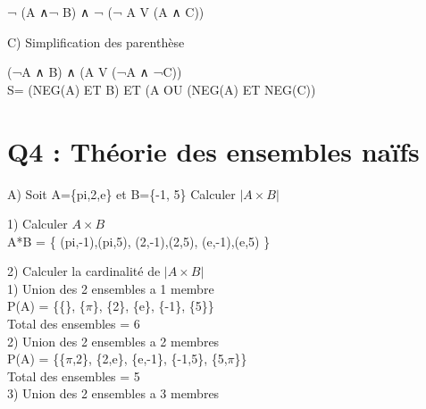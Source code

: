   ¬ (A ∧¬ B) ∧ ¬ (¬ A V (A ∧ C)) \\

\begin{flushleft}
C) Simplification des parenthèse \\
\end{flushleft}

  (¬A ∧ B) ∧ (A V (¬A ∧ ¬C)) \\

  S= (NEG(A) ET B) ET (A OU (NEG(A) ET NEG(C)) \\


\vspace{10mm} %

\section{Q4 : Théorie des ensembles naïfs}

\vspace{4mm} %

A) Soit A=\{pi,2,e\} et B=\{-1, 5\} Calculer ${|A\times B|}$ \\

\vspace{4mm} %

1) Calculer ${A\times B}$ \\

A*B = \{ (pi,-1),(pi,5), (2,-1),(2,5), (e,-1),(e,5) \}

\vspace{8mm} %

2) Calculer la cardinalité de ${|A\times B|}$ \\

1) Union des 2 ensembles a 1 membre \\

P(A) = \{\{\}, \{$\pi$\}, \{2\}, \{e\}, \{-1\}, \{5\}\} \\

Total des ensembles = 6 \\

2) Union des 2 ensembles a 2 membres \\

P(A) = \{\{$\pi$,2\}, \{2,e\}, \{e,-1\}, \{-1,5\}, \{5,$\pi$\}\} \\

Total des ensembles = 5 \\

3) Union des 2 ensembles a 3 membres \\

